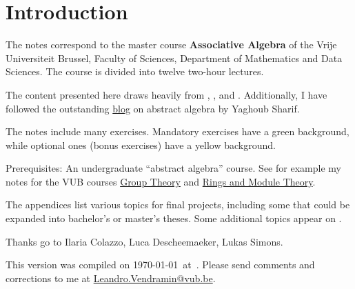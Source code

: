 \thispagestyle{plain}
\section*{Introduction}

The notes correspond to the master  
course \textbf{Associative Algebra} of the 
Vrije Universiteit Brussel, 
Faculty of Sciences, 
Department of Mathematics and Data Sciences. The course
is divided into twelve two-hour lectures. 

The content presented here draws heavily from \cite{MR3308118}, \cite{MR1449137}, 
and \cite{MR798076}. Additionally, I have 
followed the outstanding \href{https://ysharifi.wordpress.com}{blog} on 
abstract algebra by Yaghoub Sharif.


The notes include many exercises. Mandatory exercises have a \colorbox{green!5!white}{green background}, while optional ones (bonus exercises) have a \colorbox{yellow!15!white}{yellow background}.

Prerequisites: An undergraduate ``abstract algebra'' course. See for example my notes for the VUB courses \href{https://github.com/vendramin/group}{Group Theory} and \href{https://github.com/vendramin/rings}{Rings and Module Theory}.

The appendices list various topics for final projects, including some that could be expanded into bachelor's or master's theses. Some additional topics appear on 
. 


Thanks go to Ilaria Colazzo, 
Luca Descheemaeker, Lukas Simons.   

This version 
was compiled on \today~at~\currenttime.
Please send comments and corrections to me at \url{Leandro.Vendramin@vub.be}. 


